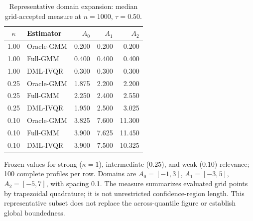 \begin{table}[htbp]
\centering
\caption{Representative domain expansion: median grid-accepted measure at $n=1000$, $\tau=0.50$.}
\label{tab:appendix-grid-measures}
\begin{tabular}{clrrr}
\toprule
$\kappa$ & Estimator & $A_0$ & $A_1$ & $A_2$ \\
\midrule
1.00 & Oracle-GMM & 0.200 & 0.200 & 0.200 \\
1.00 & Full-GMM & 0.400 & 0.400 & 0.400 \\
1.00 & DML-IVQR & 0.300 & 0.300 & 0.300 \\
0.25 & Oracle-GMM & 1.875 & 2.200 & 2.200 \\
0.25 & Full-GMM & 2.250 & 2.400 & 2.550 \\
0.25 & DML-IVQR & 1.950 & 2.500 & 3.025 \\
0.10 & Oracle-GMM & 3.825 & 7.600 & 11.300 \\
0.10 & Full-GMM & 3.900 & 7.625 & 11.450 \\
0.10 & DML-IVQR & 3.900 & 7.500 & 10.325 \\
\bottomrule
\end{tabular}
\begin{tablenotes}
Frozen values for strong ($\kappa=1$), intermediate ($0.25$), and weak ($0.10$) relevance; 100 complete profiles per row. Domains are $A_0=[-1,3]$, $A_1=[-3,5]$, $A_2=[-5,7]$, with spacing 0.1. The measure summarizes evaluated grid points by trapezoidal quadrature; it is not unrestricted confidence-region length. This representative subset does not replace the across-quantile figure or establish global boundedness.
\end{tablenotes}
\end{table}
